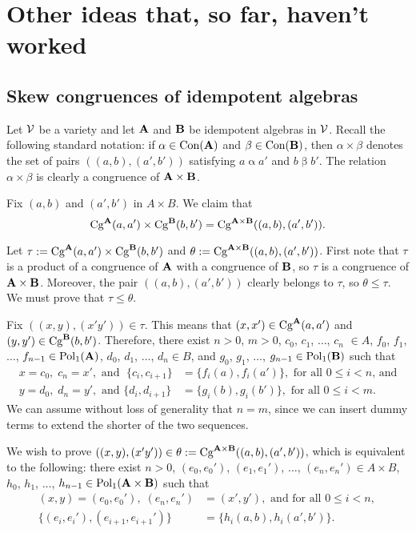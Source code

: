 \section{Other ideas that, so far, haven't worked}

\subsection{Skew congruences of idempotent algebras}
Let $\mathcal{V}$ be a variety and let $\mathbf{A}$ and $\mathbf{B}$ be idempotent
algebras in $\mathcal{V}$.
Recall the following standard notation:
if $\alpha \in \operatorname{Con}(\mathbf{A})$ and $\beta \in \operatorname{Con}(\mathbf{B})$, then
$\alpha \times \beta$ denotes the set of pairs $((a,b),(a',b'))$ satisfying
$a \mathrel{\alpha} a'$ and $b \mathrel{\beta} b'$.  The relation 
$\alpha \times \beta$ is clearly a congruence of $\mathbf{A} \times \mathbf{B}$.

Fix $(a, b)$ and $(a', b')$ in $A \times B$.
We claim that
\[\operatorname{Cg}^{\mathbf{A}}(a,a') \times \operatorname{Cg}^{\mathbf{B}}(b,b')
=\operatorname{Cg}^{\mathbf{A} \times \mathbf{B}}((a, b), (a', b')).\]

Let $\tau := \operatorname{Cg}^{\mathbf{A}}(a,a') \times \operatorname{Cg}^{\mathbf{B}}(b,b')$  %
and $\theta:= \operatorname{Cg}^{\mathbf{A} \times \mathbf{B}}((a, b), (a', b'))$.
First note that $\tau$ is a product of a congruence
of $\mathbf{A}$ with a congruence of $\mathbf{B}$, so $\tau$
is a congruence of $\mathbf{A}\times \mathbf{B}$.
Moreover, the pair $((a,b), (a',b'))$ clearly belongs to $\tau$, so
$\theta\leq \tau$.  We must prove that $\tau \leq \theta$.

Fix $((x,y),(x'y')) \in \tau$. This means that
$(x,x') \in \operatorname{Cg}^{\mathbf{A}}(a,a')$ and $(y,y')\in \operatorname{Cg}^{\mathbf{B}}(b,b')$.
Therefore, there exist $n>0$, $m>0$, 
$c_0$, $c_1$, $\dots$, $c_n$ $\in A$, $f_0$, $f_1$, $\dots$,
$f_{n-1} \in \operatorname{Pol}_1(\mathbf{A})$, $d_0$, $d_1$, $\dots$, $d_n\in B$, and $g_0$, $g_1$, $\dots$,
$g_{n-1} \in \operatorname{Pol}_1(\mathbf{B})$ such that 
\begin{align*}
  x = c_0, \; c_n=x', \text{ and } \; \{c_i, c_{i+1}\} &= \{f_i(a), f_i(a')\},
  \text{ for all $0\leq i < n$, and}\\
  y = d_0, \; d_n=y',  \text{ and }  
  \{d_i, d_{i+1}\} &= \{g_i(b), g_i(b')\}, \text{ for all $0\leq i < m$.}
\end{align*}
We can assume without loss of generality that $n=m$, since we can insert dummy
terms to extend the shorter of the two sequences.

We wish to prove $((x,y),(x'y')) \in \theta:= \operatorname{Cg}^{\mathbf{A} \times \mathbf{B}}((a, b), (a', b'))$,
which is equivalent to the following: there exist $n>0$, 
$(e_0, e_0')$, $(e_1,e_1')$, $\dots$, $(e_n, e_n') \in A\times B$, 
$h_0$, $h_1$, $\dots$, $h_{n-1} \in \operatorname{Pol}_1(\mathbf{A}\times \mathbf{B})$ such that
\begin{align*}
  (x,y) = (e_0,e_0'), \; (e_n, e_n') &=(x',y'), \text{ and for all $0\leq i < n$, } \\
  \{(e_i, e_i'), (e_{i+1}, e_{i+1}')\} &= \{h_i(a,b), h_i(a',b')\}.
\end{align*}


